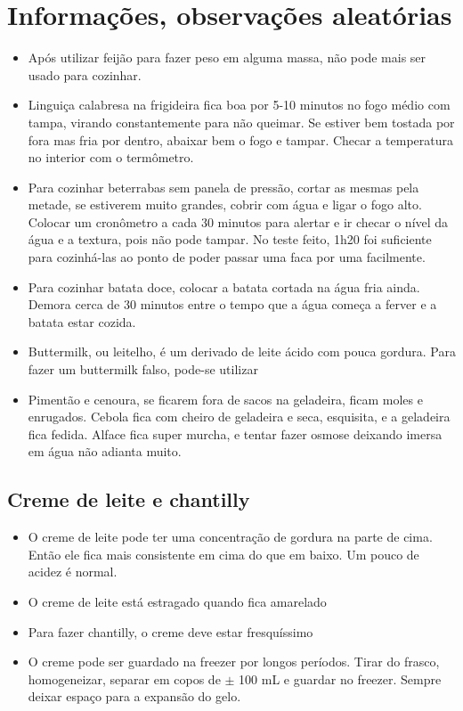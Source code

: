\section{Informações, observações aleatórias}

\begin{itemize}
	\item Após utilizar feijão para fazer peso em alguma massa, não pode mais ser usado para cozinhar.
	\item Linguiça calabresa na frigideira fica boa por 5-10 minutos no fogo médio com tampa, virando
	      constantemente para não queimar. Se estiver bem tostada por fora mas fria por dentro, abaixar bem o fogo e
	      tampar. Checar a temperatura no interior com o termômetro.
	\item Para cozinhar beterrabas sem panela de pressão, cortar as mesmas pela metade, se estiverem muito
	      grandes, cobrir com água e ligar o fogo alto. Colocar um cronômetro a cada 30 minutos para alertar e ir
	      checar o nível da água e a textura, pois não pode tampar. No teste feito, 1h20 foi suficiente para
	      cozinhá-las ao ponto de poder passar uma faca por uma facilmente.
	\item Para cozinhar batata doce, colocar a batata cortada na água fria ainda. Demora cerca de 30 minutos
	      entre o tempo que a água começa a ferver e a batata estar cozida.
	\item Buttermilk, ou leitelho, é um derivado de leite ácido com pouca gordura. Para fazer um buttermilk
	      falso, pode-se utilizar
	\item Pimentão e cenoura, se ficarem fora de sacos na geladeira, ficam moles e enrugados. Cebola fica com
	      cheiro de geladeira e seca, esquisita, e a geladeira fica fedida. Alface fica super murcha, e tentar fazer
	      osmose deixando imersa em água não adianta muito.
\end{itemize}

\subsection*{Creme de leite e chantilly}
\begin{itemize}
	\item O creme de leite pode ter uma concentração de gordura na parte de cima. Então ele fica mais
	      consistente em cima do que em baixo. Um pouco de acidez é normal.
	\item O creme de leite está estragado quando fica amarelado
	\item Para fazer chantilly, o creme deve estar fresquíssimo
	\item O creme pode ser guardado na freezer por longos períodos. Tirar do frasco, homogeneizar, separar em
	      copos de $\pm$ 100 mL e guardar no freezer. Sempre deixar espaço para a expansão do gelo.
\end{itemize}

